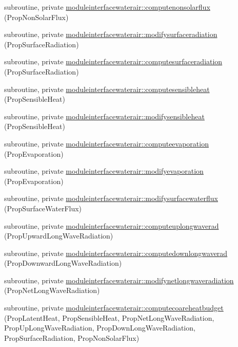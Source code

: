 \begin{DoxyCompactItemize}
\item 
subroutine, private \mbox{\hyperlink{namespacemoduleinterfacewaterair_a440fa94544c221014817ea4b5bea703a}{moduleinterfacewaterair\+::computenonsolarflux}} (Prop\+Non\+Solar\+Flux)
\item 
subroutine, private \mbox{\hyperlink{namespacemoduleinterfacewaterair_a57d8dae2ec14a4562c48bbccb24a5f96}{moduleinterfacewaterair\+::modifysurfaceradiation}} (Prop\+Surface\+Radiation)
\item 
subroutine, private \mbox{\hyperlink{namespacemoduleinterfacewaterair_ac9ef1ef38af46f9428d5e550057e60b9}{moduleinterfacewaterair\+::computesurfaceradiation}} (Prop\+Surface\+Radiation)
\item 
subroutine, private \mbox{\hyperlink{namespacemoduleinterfacewaterair_abe46b3644f7d36d7d60cc3a86eb0de5f}{moduleinterfacewaterair\+::computesensibleheat}} (Prop\+Sensible\+Heat)
\item 
subroutine, private \mbox{\hyperlink{namespacemoduleinterfacewaterair_a2724f68137207e7ade1ca13b482d8f81}{moduleinterfacewaterair\+::modifysensibleheat}} (Prop\+Sensible\+Heat)
\item 
subroutine, private \mbox{\hyperlink{namespacemoduleinterfacewaterair_a808beb15bad5f77afa64f469679f1229}{moduleinterfacewaterair\+::computeevaporation}} (Prop\+Evaporation)
\item 
subroutine, private \mbox{\hyperlink{namespacemoduleinterfacewaterair_a0c61f58f27a4d911118aadbccbbd1920}{moduleinterfacewaterair\+::modifyevaporation}} (Prop\+Evaporation)
\item 
subroutine, private \mbox{\hyperlink{namespacemoduleinterfacewaterair_a88a4ad4c4d7d19f977f8154341d169fd}{moduleinterfacewaterair\+::modifysurfacewaterflux}} (Prop\+Surface\+Water\+Flux)
\item 
subroutine, private \mbox{\hyperlink{namespacemoduleinterfacewaterair_a6cfc460eb2c0c3821a172285fe7ae066}{moduleinterfacewaterair\+::computeuplongwaverad}} (Prop\+Upward\+Long\+Wave\+Radiation)
\item 
subroutine, private \mbox{\hyperlink{namespacemoduleinterfacewaterair_ae3df7c61e2dbd50895d272ec3bdb3d28}{moduleinterfacewaterair\+::computedownlongwaverad}} (Prop\+Downward\+Long\+Wave\+Radiation)
\item 
subroutine, private \mbox{\hyperlink{namespacemoduleinterfacewaterair_a446911b7d3595fa04059369d70ebf75e}{moduleinterfacewaterair\+::modifynetlongwaveradiation}} (Prop\+Net\+Long\+Wave\+Radiation)
\item 
subroutine, private \mbox{\hyperlink{namespacemoduleinterfacewaterair_a1210cfaa400404020add49f99363970b}{moduleinterfacewaterair\+::computecoareheatbudget}} (Prop\+Latent\+Heat, Prop\+Sensible\+Heat, Prop\+Net\+Long\+Wave\+Radiation, Prop\+Up\+Long\+Wave\+Radiation, Prop\+Down\+Long\+Wave\+Radiation, Prop\+Surface\+Radiation, Prop\+Non\+Solar\+Flux)

\end{DoxyCompactItemize}
